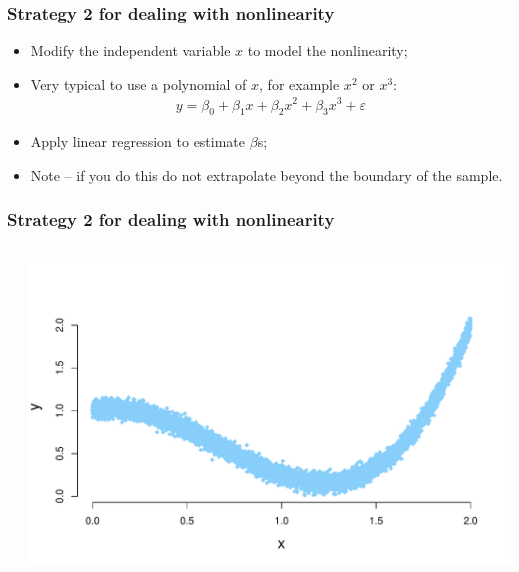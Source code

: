 \documentclass[aspectratio=169]{beamer}
\theoremstyle{principle}
\begin{document}
\begin{frame}
\frametitle{Strategy 2 for dealing with nonlinearity}

\begin{itemize}
\item Modify the independent variable $x$ to model the nonlinearity;
\bigskip

\item Very typical to use a polynomial of $x$, for example $x^2$ or $x^3$:
\begin{align*}
y = \beta_0 + \beta_1x + \beta_2x^2 + \beta_3x^3 + \varepsilon
\end{align*}

\item Apply linear regression to estimate $\beta$s;
\bigskip

\item Note -- if you do this do not extrapolate beyond the boundary of the sample.
\end{itemize}

\end{frame}

\begin{frame}
\frametitle{Strategy 2 for dealing with nonlinearity}

\begin{columns}
\begin{column}{0.3\textwidth}



\end{column}
\begin{column}{0.7\textwidth}

\begin{center}
\includegraphics[scale=0.5]{crazy_curve_2_w_axes.pdf}
\end{center}

\end{column}
\end{columns}

\end{frame}
\end{document}
